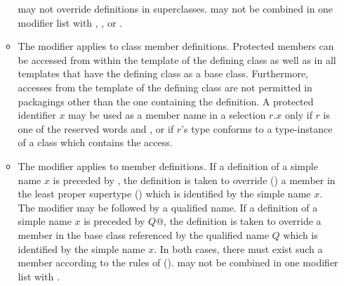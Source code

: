 \documentclass[11pt]{report}
\newcommand{\ifqualified}[1]{}
\begin{document}
\begin{itemize}
\begin{itemize}
may not override definitions in superclasses.
\verb@private@ may not be combined in one modifier list with
\verb@protected@, \verb@abstract@, \verb@final@ or
\verb@override@.
\item
The \verb@protected@ modifier applies to class member definitions.
Protected members can be accessed from within the template of the defining
class as well as in all templates that have the defining class as a base class.
Furthermore, accesses from the template of the defining class are not
permitted in packagings other than the one
containing the definition.  A protected identifier $x$ may be used as
a member name in a selection $r.x$ only if $r$ is one of the reserved
words \verb@this@ and
\verb@super@, or if $r$'s type conforms to a type-instance of a class
which contains the access.
\item
The \verb@override@ modifier applies to member definitions.  If a
definition of a simple name $x$ is preceded by
\verb@override@, the definition is taken to override
() a member in the least proper supertype
() which is identified by the simple name $x$.
The \verb@override@ modifier may be followed by a qualified name.  If
a definition of a simple name $x$ is preceded by
\verb@override $Q$@, the definition is taken to override
a member in the base class referenced by the qualified name $Q$ which
is identified by the simple name $x$.  In both cases, there must exist
such a member according to the rules of ().
\verb@override@ may not be combined in one modifier list with
\verb@private@.
\ifqualified{
\item
The \verb@qualified@ modifier applies to class or module
definitions. When present, all non-overriding member definitions of
the class or module (named $M$, say) introduce names which are
qualified by $M$.  When absent, non-overriding member definitions of
the class or module introduce names which are qualified by the empty
string $\epsilon$.
}
\end{itemize}

\end{itemize}
\end{document}

